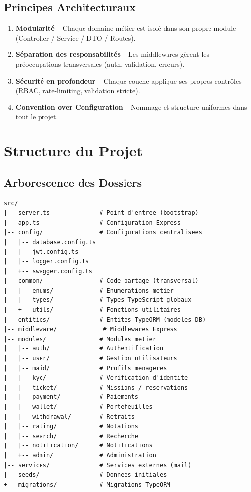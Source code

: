 \documentclass[12pt,a4paper]{report}
\begin{document}
\section{Principes Architecturaux}
\begin{enumerate}
  \item \textbf{Modularité} -- Chaque domaine métier est isolé dans son propre module (Controller / Service / DTO / Routes).
  \item \textbf{Séparation des responsabilités} -- Les middlewares gèrent les préoccupations transversales (auth, validation, erreurs).
  \item \textbf{Sécurité en profondeur} -- Chaque couche applique ses propres contrôles (RBAC, rate-limiting, validation stricte).
  \item \textbf{Convention over Configuration} -- Nommage et structure uniformes dans tout le projet.
\end{enumerate}

\chapter{Structure du Projet}

\section{Arborescence des Dossiers}
\begin{lstlisting}[language={},title={Arborescence src/}]
src/
|-- server.ts              # Point d'entree (bootstrap)
|-- app.ts                 # Configuration Express
|-- config/                # Configurations centralisees
|   |-- database.config.ts
|   |-- jwt.config.ts
|   |-- logger.config.ts
|   +-- swagger.config.ts
|-- common/                # Code partage (transversal)
|   |-- enums/             # Enumerations metier
|   |-- types/             # Types TypeScript globaux
|   +-- utils/             # Fonctions utilitaires
|-- entities/              # Entites TypeORM (modeles DB)
|-- middleware/             # Middlewares Express
|-- modules/               # Modules metier
|   |-- auth/              # Authentification
|   |-- user/              # Gestion utilisateurs
|   |-- maid/              # Profils menageres
|   |-- kyc/               # Verification d'identite
|   |-- ticket/            # Missions / reservations
|   |-- payment/           # Paiements
|   |-- wallet/            # Portefeuilles
|   |-- withdrawal/        # Retraits
|   |-- rating/            # Notations
|   |-- search/            # Recherche
|   |-- notification/      # Notifications
|   +-- admin/             # Administration
|-- services/              # Services externes (mail)
|-- seeds/                 # Donnees initiales
+-- migrations/            # Migrations TypeORM
\end{lstlisting}
\end{document}
